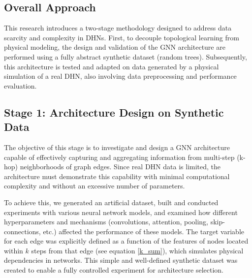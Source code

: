 \documentclass[energies,article,submit,pdftex,moreauthors]{Definitions/mdpi}
\begin{document}


\subsection{Overall Approach}

This research introduces a two-stage methodology designed to address data
scarcity and complexity in DHNs. First, to decouple topological learning from
physical modeling, the design and validation of the GNN architecture are
performed using a fully abstract synthetic dataset (random trees).
Subsequently, this architecture is tested and adapted on data generated by a
physical simulation of a real DHN, also involving data preprocessing and
performance evaluation.

\subsection{Stage 1: Architecture Design on Synthetic Data}

The objective of this stage is to investigate and design a GNN architecture
capable of effectively capturing and aggregating information from multi-step
(k-hop) neighborhoods of graph edges. Since real DHN data is limited, the
architecture must demonstrate this capability with minimal computational
complexity and without an excessive number of parameters.

To achieve this, we generated an artificial dataset, built and conducted
experiments with various neural network models, and examined how different
hyperparameters and mechanisms (convolutions, attention, pooling,
skip-connections, etc.) affected the performance of these models. The target
variable for each edge was explicitly defined as a function of the features of
nodes located within $k$ steps from that edge (see equation \ref{k_sum}), which
simulates physical dependencies in networks. This simple and well-defined
synthetic dataset was created to enable a fully controlled experiment for
architecture selection.
\end{document}

